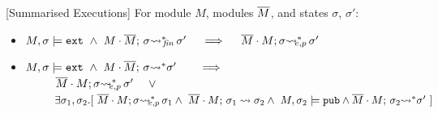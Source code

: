  
 \begin{auxLemma}
\label{lemma:external_breakdown:term}[Summarised Executions]
For   module $M$, modules $\overline{M}$, and states $\sigma$, $\sigma'$:
\\
\begin{itemize}
\item
$M,\sigma \models \extThis\ \wedge \ \leadstoBoundedStarFin {M\cdot \Mtwo}  {\sigma}  {\sigma'}  \ \ \  \ 
\Longrightarrow \ \ \  \ \leadstoBoundedExtPub {\Mtwo\cdot M}    {\sigma}  {\sigma'}$
\item
$M,\sigma \models \extThis\ \wedge \ \leadstoBoundedStar  {M\cdot \Mtwo}  {\sigma}  {\sigma'}  \ \ \  \ \ \  
\Longrightarrow$\\
$\strut \ \ \ \ \ \ \ \    \leadstoBoundedExtPub {\Mtwo\cdot M}    {\sigma}  {\sigma'}\ \ \ \  \vee$\\
$\strut \ \ \ \ \ \ \ \    \exists \sigma_1,\sigma_2.[\ 
\leadstoBoundedExtPub {\Mtwo\cdot M}    {\sigma}  {\sigma_1} 
\wedge\ \leadstoBounded  {\Mtwo\cdot M}    {\sigma_1}  {\sigma_2} 
\wedge \ M, \sigma_2 \models \pubMeth \wedge \leadstoBoundedStar  {\Mtwo\cdot M}    {\sigma_2}  {\sigma'} \ ]
$
\end{itemize}
\end{auxLemma}


